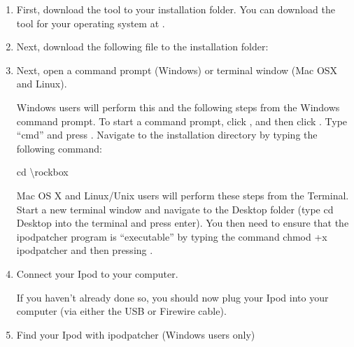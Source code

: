 \begin{enumerate} 

  \item First, download the  tool to your installation 
  folder.  You can download the  tool for your operating 
  system at .
  
  \item Next, download the following file to the installation folder: 


  \item Next, open a command prompt (Windows) or terminal window (Mac OSX and Linux).
  
    Windows users will perform this and the following steps from the Windows 
    command prompt.  To start a command prompt, click , and then 
    click .  Type ``cmd'' and press .  Navigate 
    to the installation directory by typing the following command:

    \begin{code} 
        cd \textbackslash{}rockbox
      \end{code}
      
    Mac OS X and Linux/Unix users will perform these steps from the Terminal. 
    Start a new terminal window and navigate to the Desktop folder (type cd 
    Desktop into the terminal and press enter). You then need to ensure that the 
    ipodpatcher program is ``executable'' by typing the command chmod +x 
    ipodpatcher and then pressing .
  
  \item Connect your Ipod to your computer.

    If you haven't already done so, you should now plug your Ipod into your 
    computer (via either the USB or Firewire cable).


  \item Find your Ipod with ipodpatcher (Windows users only)


\end{enumerate}
